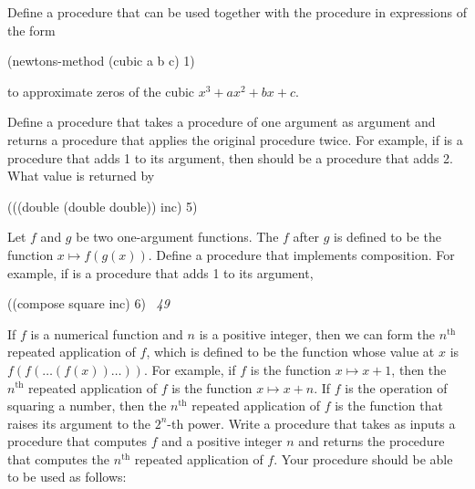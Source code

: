 \begin{exerciseGroup}
\label{Exercise 1.40}
 Define a procedure 
that can be used together with the  procedure in
expressions of the form

\begin{codeBlock}
(newtons-method (cubic a b c) 1)
\end{codeBlock}

\noindent
to approximate zeros of the cubic \( x^3 + ax^2 + bx + c \).

\label{Exercise 1.41}
 Define a procedure 
that takes a procedure of one argument as argument and returns a procedure that
applies the original procedure twice.  For example, if  is a
procedure that adds 1 to its argument, then  should be a
procedure that adds 2.  What value is returned by

\begin{codeBlock}
(((double (double double)) inc) 5)
\end{codeBlock}

\label{Exercise 1.42}
 Let \( f \) and \( g \) be two
one-argument functions.  The  \( f \) after \( g \) is defined
to be the function \( x \mapsto f(g(x)) \).  Define a procedure
 that implements composition.  For example, if  is a
procedure that adds 1 to its argument,

\begin{codeBlock}
((compose square inc) 6)
~\textit{49}~
\end{codeBlock}

\label{Exercise 1.43}
 If \( f \) is a numerical function
and \( n \) is a positive integer, then we can form the \( n^{\mathrm{th}} \) repeated
application of \( f \), which is defined to be the function whose value at \( x \)
is \( f(f(\dots (f(x))\dots )) \).  For example, if \( f \) is the
function \( x \mapsto x + 1 \), then the \( n^{\mathrm{th}} \) repeated application of \( f \) is
the function \( x \mapsto x + n \).  If \( f \) is the operation of squaring a
number, then the \( n^{\mathrm{th}} \) repeated application of \( f \) is the function that
raises its argument to the \( 2^n \)-th power.  Write a procedure that takes as
inputs a procedure that computes \( f \) and a positive integer \( n \) and returns
the procedure that computes the \( n^{\mathrm{th}} \) repeated application of \( f \).  Your
procedure should be able to be used as follows:


\end{exerciseGroup}
